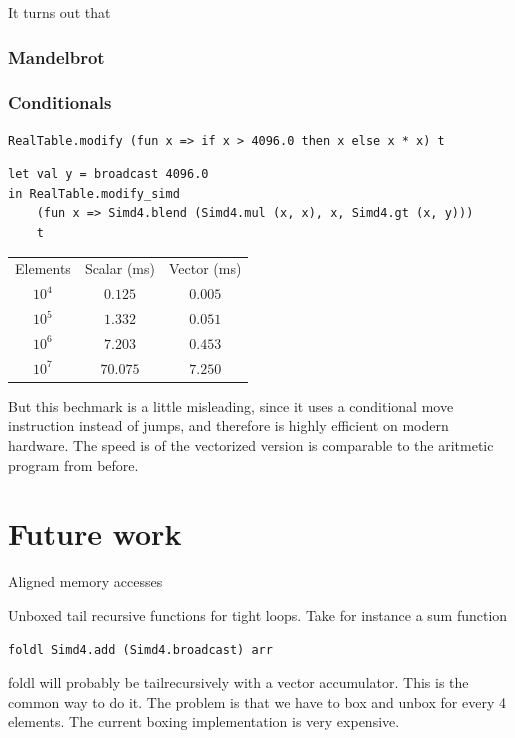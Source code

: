 \documentclass{article}
\begin{document}
It turns out that 

\subsubsection{Mandelbrot}

\subsubsection{Conditionals}

\begin{lstlisting}
RealTable.modify (fun x => if x > 4096.0 then x else x * x) t
\end{lstlisting}

\begin{lstlisting}
let val y = broadcast 4096.0
in RealTable.modify_simd
    (fun x => Simd4.blend (Simd4.mul (x, x), x, Simd4.gt (x, y)))
    t
\end{lstlisting}

\begin{center}
\begin{tabular}{ c c c }
    Elements & Scalar (ms) & Vector (ms) \\
    $10^4$ & $0.125$ & $0.005$ \\
    $10^5$ & $1.332$ & $0.051$ \\
    $10^6$ & $7.203$ & $0.453$ \\
    $10^7$ & $70.075$ & $7.250$
\end{tabular}
\end{center}

But this bechmark is a little misleading, since it uses a conditional move instruction instead of jumps, and therefore is highly efficient on modern hardware. The speed is of the vectorized version is comparable to the aritmetic program from before.

\section{Future work}

Aligned memory accesses

Unboxed tail recursive functions for tight loops. Take for instance a sum function

\begin{lstlisting}
foldl Simd4.add (Simd4.broadcast) arr
\end{lstlisting}

foldl will probably be tailrecursively with a vector accumulator. This is the common way to do it. The problem is that we have to box and unbox for every 4 elements. The current boxing implementation is very expensive.
\end{document}
